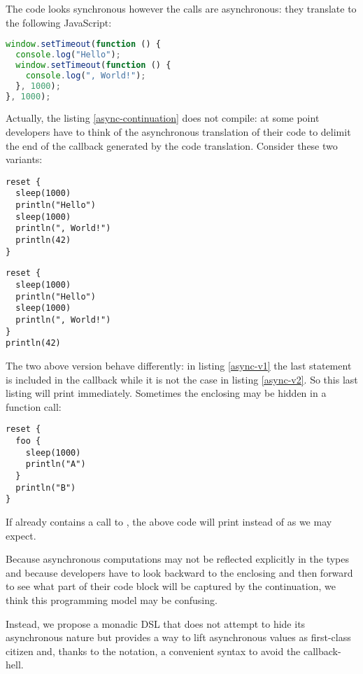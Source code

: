 \documentclass[american,english,runningheads]{llncs}
\begin{document}
The code looks synchronous however the  calls are asynchronous: they translate to the following JavaScript:
\begin{lstlisting}[language=JavaScript]
window.setTimeout(function () {
  console.log("Hello");
  window.setTimeout(function () {
    console.log(", World!");
  }, 1000);
}, 1000);
\end{lstlisting}

Actually, the listing \ref{async-continuation} does not compile: at some point developers have to think of the asynchronous translation of their code to delimit the end of the callback generated by the code translation. Consider these two variants:

\begin{lstlisting}[label=async-v1,caption=Version 1]
reset {
  sleep(1000)
  println("Hello")
  sleep(1000)
  println(", World!")
  println(42)
}
\end{lstlisting}
\begin{lstlisting}[label=async-v2,caption=Version 2]
reset {
  sleep(1000)
  println("Hello")
  sleep(1000)
  println(", World!")
}
println(42)
\end{lstlisting}

The two above version behave differently: in listing \ref{async-v1} the last  statement is included in the callback while it is not the case in listing \ref{async-v2}. So this last listing will print  immediately. Sometimes the enclosing  may be hidden in a function call:

\begin{lstlisting}[label=async-ambiguous,caption=Ambiguous reading]
reset {
  foo {
    sleep(1000)
    println("A")
  }
  println("B")
}
\end{lstlisting}

If  already contains a call to , the above code will print  instead of  as we may expect.

Because asynchronous computations may not be reflected explicitly in the types and because developers have to look backward to the enclosing  and then forward to see what part of their code block will be captured by the continuation, we think this programming model may be confusing.

Instead, we propose a monadic DSL that does not attempt to hide its asynchronous nature but provides a way to lift asynchronous values as first-class citizen and, thanks to the  notation, a convenient syntax to avoid the callback-hell.
\end{document}
